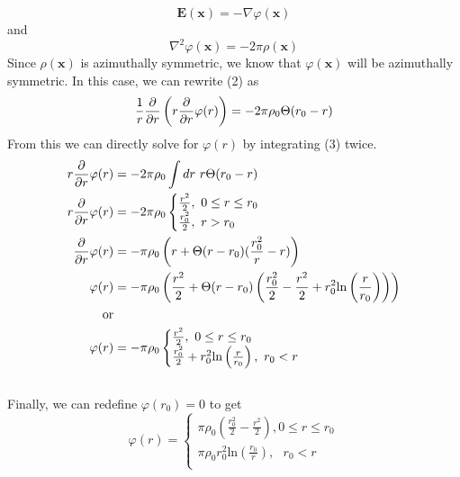\documentclass[]{book}
\begin{document}
\begin{equation}
\textbf{E}(\textbf{x}) = - \nabla\varphi(\textbf{x})
\end{equation}
and 
\begin{equation}
\nabla^2\varphi(\textbf{x}) = -2 \pi\rho(\textbf{x})
\end{equation}
Since $\rho(\textbf{x})$ is azimuthally symmetric, we know that $\varphi(\textbf{x})$ will be azimuthally symmetric. In this case, we can rewrite (2) as
\begin{equation}
\frac{1}{r}\pdv{r}\left( r\pdv{r}\varphi(r)\right) = -2\pi\rho_0 \Theta(r_0-r)
\end{equation}
From this we can directly solve for $\varphi(r)$ by integrating (3) twice.
\begin{equation}
\begin{split}
r\pdv{r}\varphi(r) & = -2\pi\rho_0 \int dr \text{ } r \Theta(r_0-r) \\
r\pdv{r}\varphi(r) & = -2\pi\rho_0 \begin{cases}
\frac{r^2}{2}, \text{ } 0\leq r\leq r_0 \\
\frac{r_0^2}{2}, \text{ }r>r_0 \\
\end{cases} \\
\pdv{r}\varphi(r) & = -\pi\rho_0 \left( r + \Theta(r-r_0)(\frac{r_0^2}{r} - r)\right) \\
\varphi(r) & = -\pi\rho_0\left( \frac{r^2}{2} +  \Theta(r-r_0)\left( \frac{r_0^2}{2} - \frac{r^2}{2} + r_0^2\text{ln}\left( \frac{r}{r_0}\right) \right) \right) \\
\text{or} \\
\varphi(r) & = -\pi\rho_0 \begin{cases}
\frac{r^2}{2}, \text{ } 0\leq r\leq r_0 \\
\frac{r_0^2}{2} + r_0^2\text{ln}\left( \frac{r}{r_0}\right), \text{ } r_0 < r \\
\end{cases}
\\
\end{split}
\end{equation}
\\
Finally, we can redefine $\varphi(r_0)=0$ to get
\begin{equation}
\varphi(r) = \begin{cases}
\pi\rho_0\left( \frac{r_0^2}{2} - \frac{r^2}{2} \right) , 0\leq r\leq r_0 \\
\pi\rho_0 r_0^2 \text{ln}\left( \frac{r_0}{r}\right), \text{ } r_0 < r \\
\end{cases}
\end{equation}
\end{document}
